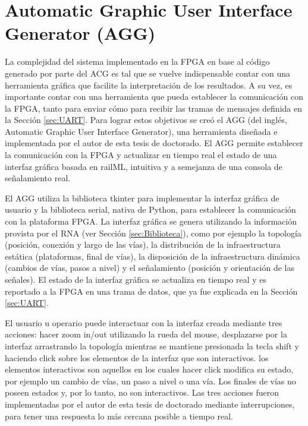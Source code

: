 \chapter{Automatic Graphic User Interface Generator (AGG)}
	\label{sec:AGG}
	
	La complejidad del sistema implementado en la FPGA en base al código generado por parte del ACG es tal que se vuelve indispensable contar con una herramienta gráfica que facilite la interpretación de los resultados. A su vez, es importante contar con una herramienta que pueda establecer la comunicación con la FPGA, tanto para enviar cómo para recibir las tramas de mensajes definida en la Sección \ref{sec:UART}. Para lograr estos objetivos se creó el AGG (del inglés, Automatic Graphic User Interface Generator), una herramienta diseñada e implementada por el autor de esta tesis de doctorado. El AGG permite establecer la comunicación con la FPGA y actualizar en tiempo real el estado de una interfaz gráfica basada en railML, intuitiva y a semejanza de una consola de señalamiento real.
	
	El AGG utiliza la biblioteca tkinter \cite{TKINTER} para implementar la interfaz gráfica de usuario y la biblioteca serial, nativa de Python, para establecer la comunicación con la plataforma FPGA. La interfaz gráfica se genera utilizando la información provista por el RNA (ver Sección \ref{sec:Biblioteca}), como por ejemplo la topología (posición, conexión y largo de las vías), la distribución de la infraestructura estática (plataformas, final de vías), la disposición de la infraestructura dinámica (cambios de vías, pasos a nivel) y el señalamiento (posición y orientación de las señales). El estado de la interfaz gráfica se actualiza en tiempo real y es reportado a la FPGA en una trama de datos, que ya fue explicada en la Sección \ref{sec:UART}.
	
	El usuario u operario puede interactuar con la interfaz creada mediante tres acciones: hacer zoom in/out utilizando la rueda del mouse, desplazarse por la interfaz arrastrando la topología mientras se mantiene presionada la tecla shift y haciendo click sobre los elementos de la interfaz que son interactivos. los elementos interactivos son aquellos en los cuales hacer click modifica su estado, por ejemplo un cambio de vías, un paso a nivel o una vía. Los finales de vías no poseen estados y, por lo tanto, no son interactivos. Las tres acciones fueron implementadas por el autor de esta tesis de doctorado mediante interrupciones, para tener una respuesta lo más cercana posible a tiempo real. 
	

